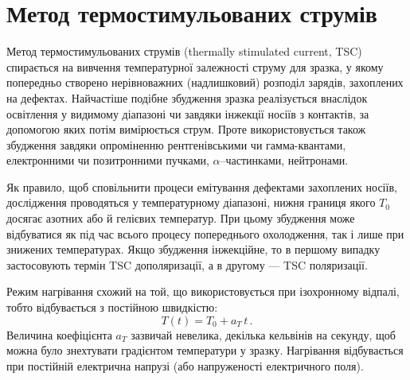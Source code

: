 \documentclass[10pt,a5paper,titlepage,oneside]{book}
\numberwithin{equation}{part}
\renewcommand{\theequation}{\thechapter.\arabic{equation}}
\begin{document}








\renewcommand\bibname{Рекомендована та використана література}

\vspace{-5cm}
\setcounter{page}{3}

\clearpage
 \tableofcontents













\chapter{Метод термостимульованих струмів}\label{chapTSC}

Метод термостимульованих струмів
(thermally stimulated current, TSC)
спирається на вивчення температурної залежності струму для зразка,
у якому попередньо створено нерівноважних (надлишковий) розподіл зарядів, захоплених на дефектах.
Найчастіше подібне збудження зразка реалізується внаслідок освітлення
у видимому діапазоні чи завдяки інжекції носіїв з контактів,
за допомогою яких потім вимірюється струм.
Проте використовується також збудження завдяки опроміненню
рентгенівськими чи гамма-квантами, електронними чи позитронними пучками,
$\alpha$--частинками, нейтронами.

Як правило, щоб сповільнити процеси емітування дефектами захоплених носіїв,
дослідження проводяться у температурному діапазоні,
нижня границя якого $T_0$ досягає азотних або й гелієвих температур.
При цьому збудження може відбуватися як під час всього процесу попереднього охолодження,
так і лише при знижених температурах.
Якщо збудження інжекційне, то в першому випадку застосовують
термін TSC дополяризації, а  в другому --- TSC поляризації.

Режим нагрівання схожий на той, що
використовується при ізохронному відпалі, тобто відбувається з постійною
швидкістю:
\begin{equation}
\label{TSCT}
T(t)=T_0+a_T\,t\,.
\end{equation}
Величина коефіцієнта $a_T$ зазвичай невелика,
декілька кельвінів на секунду, щоб
можна було знехтувати градієнтом температури у зразку.
Нагрівання відбувається при постійній електрична напрузі (або напруженості електричного поля).
\end{document}
